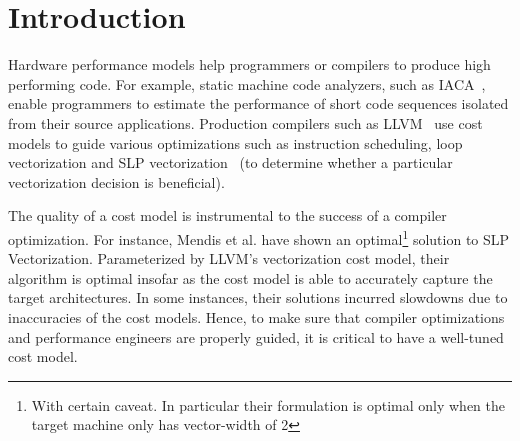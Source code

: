 \section{Introduction}

Hardware performance models help programmers or compilers to 
produce high performing code.
For example, static machine code analyzers, such as IACA~\cite{iaca}, enable programmers
to estimate the performance of short code sequences
isolated from their source applications.
Production compilers such as LLVM~\cite{llvm} use cost models to guide various optimizations such as instruction scheduling, loop
vectorization and SLP vectorization~\cite{slp} (to determine whether a particular vectorization decision is beneficial).


The quality of a cost model is instrumental to the success of a compiler optimization. 
For instance, Mendis et al.\cite{goslp}
have shown an optimal\footnote{
With certain caveat.
In particular their formulation is optimal
only when the target machine only has vector-width of 2}
solution to SLP Vectorization\cite{slp}.
Parameterized by LLVM's vectorization cost model\cite{llvm-cost},
their algorithm is optimal insofar as the cost model is able to accurately 
capture the target architectures.
In some instances, their solutions incurred slowdowns due to inaccuracies of 
the cost models.
Hence, to make sure that compiler optimizations and performance engineers are properly guided, it is critical to have 
a well-tuned cost model.

